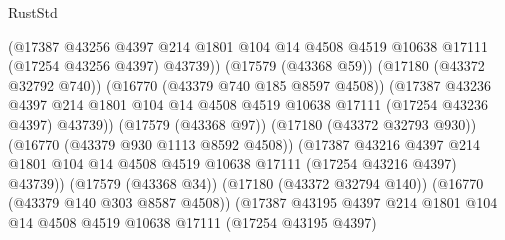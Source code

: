 \begin{lexlean}{RustStd}
\begin{coremodule}
                                  (@17387
                                    @43256
                                    @4397
                                    @214
                                    @1801
                                    @104
                                    @14
                                    @4508
                                    @4519
                                    @10638
                                    @17111
                                    (@17254 @43256 @4397)
                                    @43739))
                                (@17579 (@43368 @59))
                                (@17180 (@43372 @32792 @740))
                                (@16770 (@43379 @740 @185 @8597 @4508))
                                (@17387
                                  @43236
                                  @4397
                                  @214
                                  @1801
                                  @104
                                  @14
                                  @4508
                                  @4519
                                  @10638
                                  @17111
                                  (@17254 @43236 @4397)
                                  @43739))
                              (@17579 (@43368 @97))
                              (@17180 (@43372 @32793 @930))
                              (@16770 (@43379 @930 @1113 @8592 @4508))
                              (@17387
                                @43216
                                @4397
                                @214
                                @1801
                                @104
                                @14
                                @4508
                                @4519
                                @10638
                                @17111
                                (@17254 @43216 @4397)
                                @43739))
                            (@17579 (@43368 @34))
                            (@17180 (@43372 @32794 @140))
                            (@16770 (@43379 @140 @303 @8587 @4508))
                            (@17387
                              @43195
                              @4397
                              @214
                              @1801
                              @104
                              @14
                              @4508
                              @4519
                              @10638
                              @17111
                              (@17254 @43195 @4397)

\end{coremodule}
\end{lexlean}
